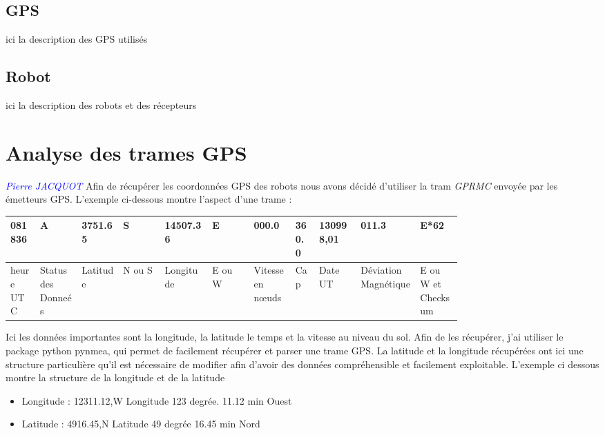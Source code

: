 \documentclass[10pt,a4paper]{report}
\begin{document}
\subsection{GPS}
ici la description des GPS utilisés
\subsection{Robot}
ici la description des robots et des récepteurs
\section{Analyse des trames GPS}
\textcolor{blue}{\textit{Pierre JACQUOT}}
Afin de récupérer les coordonnées GPS des robots nous avons décidé d'utiliser la tram \textit{GPRMC} envoyée par les émetteurs GPS. L'exemple ci-dessous montre l'aspect d'une trame : \newline
\begin{center}
\begin{tabular}{|m{0.05\linewidth}|m{0.07\linewidth}|m{0.07\linewidth}|m{0.07\linewidth}|m{0.08\linewidth}|m{0.07\linewidth}|m{0.07\linewidth}|m{0.04\linewidth}|m{0.07\linewidth}|m{0.1\linewidth}|m{0.07\linewidth}|}
\hline
    081836 & A & 3751.65 & S & 14507.36 & E & 000.0 & 360.0 & 130998,01 & 011.3 & E*62  \\ \hline
    heure UTC & Status des Donneés & Latitude & N ou S & Longitude & E ou W & Vitesse en nœuds & Cap & Date UT & Déviation Magnétique & E ou W et Checksum \\ \hline

\end{tabular}
\end{center}
Ici les données importantes sont la longitude, la latitude le temps et la vitesse au niveau du sol. Afin de les récupérer, j'ai utiliser le package python pynmea, qui permet de facilement récupérer et parser une trame GPS. \newline
La latitude et la longitude récupérées ont ici une structure particulière qu'il est nécessaire de modifier afin d'avoir des données compréhensible et facilement exploitable. L'exemple ci dessous montre la structure de la longitude et de la latitude \newline
\begin{itemize}
  \item Longitude  : 12311.12,W   Longitude 123 degrée. 11.12 min Ouest
  \item Latitude : 4916.45,N    Latitude 49 degrée 16.45 min Nord
\end{itemize}
\end{document}

